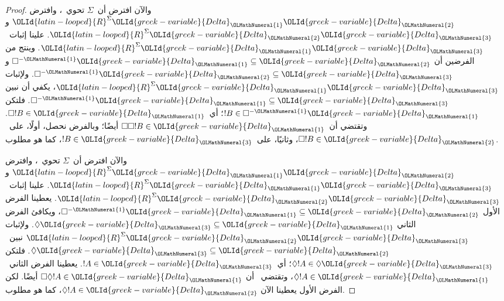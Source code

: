 \documentclass[../../../include/open-logic-section]{subfiles}
\begin{document}
\begin{proof}
  والآن افترض أن~$\Sigma$ تحوي~، وافترض
  $\OLId{latin-looped}{R}^\Sigma \OLId{greek-variable}{Delta}_\OLMathNumeral{1}\OLId{greek-variable}{Delta}_\OLMathNumeral{2}$ و$\OLId{latin-looped}{R}^\Sigma \OLId{greek-variable}{Delta}_\OLMathNumeral{2}\OLId{greek-variable}{Delta}_\OLMathNumeral{3}$.
  علينا إثبات~$\OLId{latin-looped}{R}^\Sigma \OLId{greek-variable}{Delta}_\OLMathNumeral{1}\OLId{greek-variable}{Delta}_\OLMathNumeral{3}$. وينتج من الفرضين
   أن
  $\Box^{-\OLMathNumeral{1}}\OLId{greek-variable}{Delta}_\OLMathNumeral{1} \subseteq \OLId{greek-variable}{Delta}_\OLMathNumeral{2}$ و
  $\Box^{-\OLMathNumeral{1}}\OLId{greek-variable}{Delta}_\OLMathNumeral{2} \subseteq \OLId{greek-variable}{Delta}_\OLMathNumeral{3}$. ولإثبات
  $\OLId{latin-looped}{R}^\Sigma \OLId{greek-variable}{Delta}_\OLMathNumeral{1}\OLId{greek-variable}{Delta}_\OLMathNumeral{3}$، يكفي أن نبين
  $\Box^{-\OLMathNumeral{1}}\OLId{greek-variable}{Delta}_\OLMathNumeral{1} \subseteq \OLId{greek-variable}{Delta}_\OLMathNumeral{3}$. فلتكن
  $!B \in \Box^{-\OLMathNumeral{1}}\OLId{greek-variable}{Delta}_\OLMathNumeral{1}$؛ أي~$\Box!B \in \OLId{greek-variable}{Delta}_\OLMathNumeral{1}$. وتقتضي
   أن~$\Box\Box!B \in \OLId{greek-variable}{Delta}_\OLMathNumeral{1}$ أيضًا؛ وبالفرض نحصل، أولًا،
  على~$\Box!B \in \OLId{greek-variable}{Delta}_\OLMathNumeral{2}$، وثانيًا، على~$!B \in \OLId{greek-variable}{Delta}_\OLMathNumeral{3}$، كما هو
  مطلوب.

  والآن افترض أن~$\Sigma$ تحوي~، وافترض
  $\OLId{latin-looped}{R}^\Sigma \OLId{greek-variable}{Delta}_\OLMathNumeral{1}\OLId{greek-variable}{Delta}_\OLMathNumeral{2}$ و$\OLId{latin-looped}{R}^\Sigma \OLId{greek-variable}{Delta}_\OLMathNumeral{1}\OLId{greek-variable}{Delta}_\OLMathNumeral{3}$.
  علينا إثبات~$\OLId{latin-looped}{R}^\Sigma \OLId{greek-variable}{Delta}_\OLMathNumeral{2}\OLId{greek-variable}{Delta}_\OLMathNumeral{3}$. يعطينا الفرض الأول
  $\Box^{-\OLMathNumeral{1}}\OLId{greek-variable}{Delta}_\OLMathNumeral{1} \subseteq \OLId{greek-variable}{Delta}_\OLMathNumeral{2}$، ويكافئ الفرض الثاني
  $\Diamond\OLId{greek-variable}{Delta}_\OLMathNumeral{3} \subseteq \OLId{greek-variable}{Delta}_\OLMathNumeral{1}$. ولإثبات
  $\OLId{latin-looped}{R}^\Sigma \OLId{greek-variable}{Delta}_\OLMathNumeral{2}\OLId{greek-variable}{Delta}_\OLMathNumeral{3}$
  نبين~$\Diamond\OLId{greek-variable}{Delta}_\OLMathNumeral{3} \subseteq \OLId{greek-variable}{Delta}_\OLMathNumeral{2}$. فلتكن
  $\Diamond!A \in \Diamond\OLId{greek-variable}{Delta}_\OLMathNumeral{3}$؛ أي~$!A \in \OLId{greek-variable}{Delta}_\OLMathNumeral{3}$. يعطينا
  الفرض الثاني~$\Diamond!A \in \OLId{greek-variable}{Delta}_\OLMathNumeral{1}$، وتقتضي~ أن
  $\Box\Diamond!A \in \OLId{greek-variable}{Delta}_\OLMathNumeral{1}$ أيضًا. لكن الفرض الأول يعطينا الآن
  $\Diamond!A \in \OLId{greek-variable}{Delta}_\OLMathNumeral{2}$، كما هو مطلوب.
\end{proof}
\end{document}
